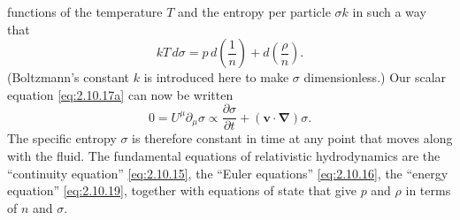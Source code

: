 functions of the temperature \(T\) and the entropy per particle \(\sigma k\)
in such a way that
\begin{equation}
  kT\,d\sigma=p\,d\left(\frac1n\right)
  +d\left(\frac{\rho}{n}\right).
  \tag{2.10.18}\label{eq:2.10.18}
\end{equation}
(Boltzmann's constant \(k\) is introduced here to make \(\sigma\)
dimensionless.) Our scalar equation \eqref{eq:2.10.17a} can now be written
\begin{equation}
  0=U^\mu\partial_\mu\sigma
  \propto\frac{\partial\sigma}{\partial t}
  +(\mathbf v\cdot\boldsymbol{\nabla})\sigma .
  \tag{2.10.19}\label{eq:2.10.19}
\end{equation}
The specific entropy \(\sigma\) is therefore constant in time at any point
that moves along with the fluid. The fundamental equations of relativistic
hydrodynamics are the ``continuity equation'' \eqref{eq:2.10.15}, the ``Euler
equations'' \eqref{eq:2.10.16}, the ``energy equation''
\eqref{eq:2.10.19}, together with equations of state that give \(p\) and
\(\rho\) in terms of \(n\) and \(\sigma\).

